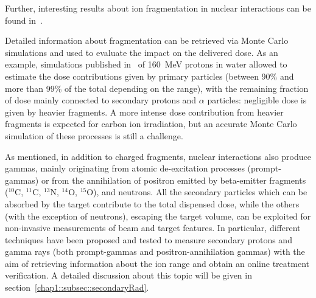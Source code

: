 Further, interesting results about ion fragmentation in nuclear interactions can be found in~\cite{Matsufuji2003, Wroe2005, Haettner2006, Gunzert-Marx2008, Haettner2013}.

Detailed information about fragmentation can be retrieved via Monte Carlo simulations and used to evaluate the impact on the delivered dose. As an example, simulations published in~\parencite{Grassberger2011} of 160~MeV protons in water allowed to estimate the dose contributions given by primary particles (between 90\% and more than 99\% of the total depending on the range), with the remaining fraction of dose mainly connected to secondary protons and $\alpha$ particles: negligible dose is given by heavier fragments. A more intense dose contribution from heavier fragments is expected for carbon ion irradiation, but an accurate Monte Carlo simulation of these processes is still a challenge.

As mentioned, in addition to charged fragments, nuclear interactions also produce gammas, mainly originating from atomic de-excitation processes (prompt-gammas) or from the annihilation of positron emitted by beta-emitter fragments ($^{10}$C, $^{11}$C, $^{13}$N, $^{14}$O, $^{15}$O), and neutrons. All the secondary particles which can be absorbed by the target contribute to the total dispensed dose, while the others (with the exception of neutrons), escaping the target volume, can be exploited for non-invasive measurements of beam and target features. In particular, different techniques have been proposed and tested to measure secondary protons and gamma rays (both prompt-gammas and positron-annihilation gammas) with the aim of retrieving information about the ion range and obtain an online treatment verification. A detailed discussion about this topic will be given in section~\ref{chap1::subsec::secondaryRad}.

